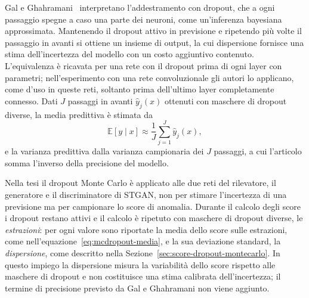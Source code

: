 Gal e Ghahramani~\cite{gal2016dropout} interpretano l'addestramento con dropout, che a ogni passaggio spegne a caso una parte dei neuroni, come un'inferenza bayesiana approssimata. Mantenendo il dropout attivo in previsione e ripetendo più volte il passaggio in avanti si ottiene un insieme di output, la cui dispersione fornisce una stima dell'incertezza del modello con un costo aggiuntivo contenuto. L'equivalenza è ricavata per una rete con il dropout prima di ogni layer con parametri; nell'esperimento con una rete convoluzionale gli autori lo applicano, come d'uso in queste reti, soltanto prima dell'ultimo layer completamente connesso. Dati $J$ passaggi in avanti $\hat{y}_j(x)$ ottenuti con maschere di dropout diverse, la media predittiva è stimata da
\begin{equation}
    \mathbb{E}[y\mid x]\approx\frac{1}{J}\sum_{j=1}^{J}\hat{y}_j(x),
    \label{eq:mcdropout-media}
\end{equation}
e la varianza predittiva dalla varianza campionaria dei $J$ passaggi, a cui l'articolo somma l'inverso della precisione del modello.

Nella tesi il dropout Monte Carlo è applicato alle due reti del rilevatore, il generatore e il discriminatore di STGAN, non per stimare l'incertezza di una previsione ma per campionare lo score di anomalia. Durante il calcolo degli score i dropout restano attivi e il calcolo è ripetuto con maschere di dropout diverse, le \emph{estrazioni}: per ogni valore sono riportate la media dello score sulle estrazioni, come nell'equazione~\eqref{eq:mcdropout-media}, e la sua deviazione standard, la \emph{dispersione}, come descritto nella Sezione~\ref{sec:score-dropout-montecarlo}. In questo impiego la dispersione misura la variabilità dello score rispetto alle maschere di dropout e non costituisce una stima calibrata dell'incertezza; il termine di precisione previsto da Gal e Ghahramani non viene aggiunto.

